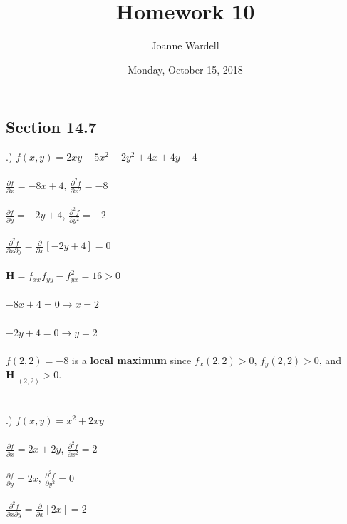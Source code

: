 \documentclass[12pt]{article}
\title{\vspace{-2.0cm}Homework 10}
\author{Joanne Wardell}
\date{Monday, October 15, 2018}
\begin{document}
\maketitle

\subsection*{Section 14.7}
.) $f(x,y) = 2xy-5x^{2}-2y^{2}+4x + 4y -4$\\\\
\noindent $\frac{\partial f}{\partial x} = -8x + 4$, \hspace{10pt} $\frac{\partial ^{2} f}{\partial x^{2}} = -8$\\\\
\noindent $\frac{\partial f}{\partial y} = -2y + 4$, \hspace{10pt} $\frac{\partial ^{2} f}{\partial y^{2}} = -2$\\\\
\noindent $\frac{\partial^{2} f}{\partial x \partial y } = \frac{\partial }{\partial x}[-2y + 4] = 0$\\\\
\noindent $\mathbf{H} = f_{xx}f_{yy} - f_{yx}^{2} = 16 > 0$\\\\
\noindent $-8x + 4 = 0 \rightarrow x = 2$\\\\
\noindent $-2y + 4 = 0 \rightarrow y = 2$\\\\
\noindent $f(2, 2) = -8$ is a \textbf{local maximum} since $f_{x}(2, 2) > 0$, $f_{y}(2, 2) > 0$, and $\mathbf{H}\Big|_{(2,2)} > 0$.\\\\\\
.) $f(x, y) = x^{2} + 2xy$\\\\
\noindent $\frac{\partial f}{\partial x} = 2x + 2y$, \hspace{10pt} $\frac{\partial ^{2} f}{\partial x^{2}} = 2$\\\\
\noindent $\frac{\partial f}{\partial y} = 2x$, \hspace{10pt} $\frac{\partial ^{2} f}{\partial y^{2}} = 0$\\\\
\noindent $\frac{\partial^{2} f}{\partial x \partial y } = \frac{\partial }{\partial x}[2x] = 2$\\\\
\end{document}
